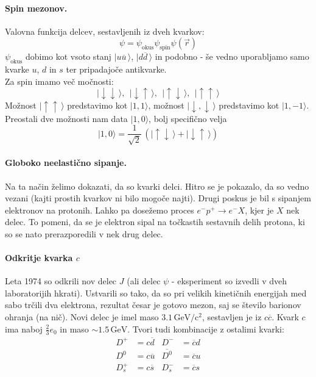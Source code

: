 \documentclass[a4paper]{article}
\newcommand{\vct}[1]{\overrightarrow{#1}}
\begin{document}
\paragraph{Spin mezonov.} Valovna funkcija delcev, sestavljenih iz dveh kvarkov:
$$\psi = \psi_{\text{okus}} \psi_{\text{spin}} \psi (\vct{r})$$
$\psi_{\text{okus}}$ dobimo kot vsoto stanj $|u \overline{u}\,\rangle$, $|d\overline{d}\,\rangle$ in podobno
- še vedno uporabljamo samo kvarke $u$, $d$ in $s$ ter pripadajoče antikvarke. \\
Za spin imamo več močnosti:
$$|\downarrow \downarrow\,\rangle,~~|\downarrow \uparrow\,\rangle,~~|\uparrow \downarrow\,\rangle,~~|\uparrow \uparrow\,\rangle$$
Možnost $|\uparrow \uparrow\,\rangle$ predstavimo kot $|1, 1\rangle$, možnost $|\downarrow, \downarrow\,\rangle$ predstavimo kot $|1, -1\rangle$.
Preostali dve možnosti nam data $|1, 0\rangle$, bolj specifično velja
$$|1, 0\rangle = \frac{1}{\sqrt{2}}\,\left(|\uparrow\downarrow\,\rangle + |\downarrow\uparrow\,\rangle\right)$$
\paragraph{Globoko neelastično sipanje.} Na ta način želimo dokazati, da so kvarki delci. Hitro se je pokazalo, da
so vedno vezani (kajti prostih kvarkov ni bilo mogoče najti). Drugi poskus je bil s sipanjem elektronov na protonih.
Lahko pa dosežemo proces $e^- p ^+ \to e^- X$, kjer je $X$ nek delec. To pomeni, da se je elektron sipal na
točkastih sestavnih delih protona, ki so se nato prerazporedili v nek drug delec.
\paragraph{Odkritje kvarka $c$} Leta 1974 so odkrili nov delec $J$ (ali delec $\psi$ - eksperiment so izvedli v dveh laboratorijih hkrati).
Ustvarili so tako, da so pri velikih kinetičnih energijah med sabo trčili dva elektrona, rezultat česar je gotovo mezon, saj se število barionov ohranja (na nič).
Novi delec je imel maso $3.1\,\mathrm{GeV/c^2}$, sestavljen je iz $c\overline{c}$. Kvark $c$ ima naboj $\displaystyle{\frac{2}{3}e_0}$ in maso $\sim 1.5\,\mathrm{GeV}$.
Tvori tudi kombinacije z ostalimi kvarki:
\begin{align*}
    D^+ & = c\overline{d} & D^- & = \overline{c}d \\
    D^0 & = c\overline{u} & \overline{D^0} & = \overline{c}u \\
    D_s^+ & = c\overline{s} & D_s^- & = \overline{c}s \\
\end{align*}
\end{document}
